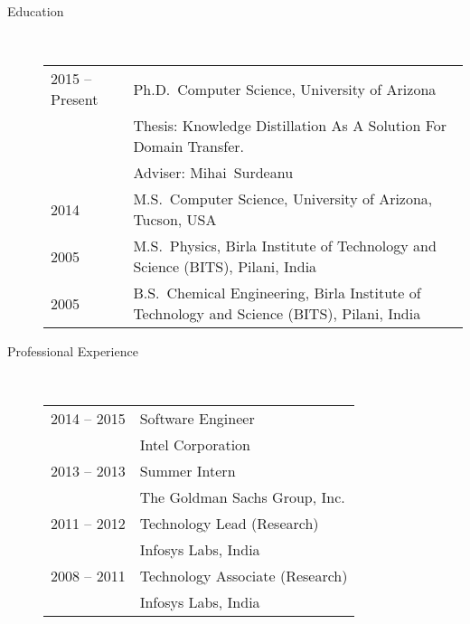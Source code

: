 \documentclass[10pt]{article}
\begin{document}
\begin{description}

\item [Education]\

\begin{tabular}{lp{4.5in}}
\hspace{-.2cm}2015 -- Present &  Ph.D.~Computer Science, {\sc University of Arizona}
\\\vspace{.0cm}&Thesis: Knowledge Distillation As A Solution For Domain Transfer.
\\\vspace{.1cm}& Adviser: Mihai~Surdeanu\\
\vspace{.1cm}\hspace{-.2cm}2014 &  M.S.~Computer Science, {\sc University of Arizona, Tucson, USA} \\
\vspace{.1cm}\hspace{-.2cm}2005 &  M.S.~Physics, {\sc Birla Institute of Technology and Science (BITS), Pilani, India} \\
\hspace{-.2cm}2005 & B.S.~Chemical Engineering,  {\sc Birla Institute of Technology and Science (BITS), Pilani, India}
\end{tabular}


\item [Professional Experience]\

\begin{tabular}{lp{4.9in}}


\hspace{-.2cm}2014 -- 2015 & Software Engineer\\\vspace{.1cm}
& {\sc Intel Corporation} \\

\hspace{-.2cm}2013 -- 2013 & Summer Intern\\\vspace{.1cm}
& {\sc The Goldman Sachs Group, Inc.} \\

\hspace{-.2cm}2011 -- 2012 & Technology Lead (Research)\\\vspace{.1cm}
&  {\sc Infosys Labs, India} \\

\hspace{-.2cm}2008 -- 2011 & Technology Associate (Research)\\\vspace{.1cm}
& {\sc Infosys Labs, India} \\


\end{tabular}
\end{description}
\end{document}
